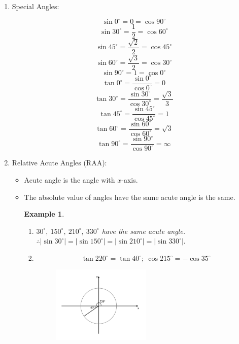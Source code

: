 \documentclass[12pt, a4paper]{article}
\newtheorem{example}{Example}[subsection]
\begin{document}
\begin{enumerate}
\begin{itemize}
\begin{figure}[H]
    \end{figure}
  \end{itemize}
  \item Special Angles: 
  \begin{multicols}{2}
    $$\sin0^\circ=0=\cos90^\circ$$
    $$\sin30^\circ=\frac{1}{2}=\cos60^\circ$$
    $$\sin45^\circ=\frac{\sqrt{2}}{2}=\cos45^\circ$$
    $$\sin60^\circ=\frac{\sqrt{3}}{2}=\cos30^\circ$$
    $$\sin90^\circ=1=\cos0^\circ$$
    $$\tan0^\circ=\frac{\sin0^\circ}{\cos0^\circ}=0$$
    $$\tan30^\circ=\frac{\sin30^\circ}{\cos30^\circ}=\frac{\sqrt{3}}{3}$$
    $$\tan45^\circ=\frac{\sin45^\circ}{\cos45^\circ}=1$$
    $$\tan60^\circ=\frac{\sin60^\circ}{\cos60^\circ}=\sqrt{3}$$
    $$\tan90^\circ=\frac{\sin90^\circ}{\cos90^\circ}=\infty$$
  \end{multicols}
  \item Relative Acute Angles (RAA): 
  \begin{itemize}
    \item Acute angle is the angle with $x$-axis.
    \item The absolute value of angles have the same acute angle is the same. 
    \begin{example}
      \begin{enumerate}
        \item $30^\circ,\ 150^\circ,\ 210^\circ,\ 330^\circ$ have the same acute angle. \\
        $\therefore \left|\sin30^\circ\right|=\left|\sin150^\circ\right|=\left|\sin210^\circ\right|=\left|\sin330^\circ\right|.$
        \item $$\tan220^\circ=\tan40^\circ;\ \cos215^\circ=-\cos35^\circ$$
        \begin{figure}[H]
          \centering
          \includegraphics[width=0.5\textwidth]{Fig.3.24.jpg}
        \end{figure}
      \end{enumerate}
    \end{example}
  \end{itemize}
\end{enumerate}
\end{document}
